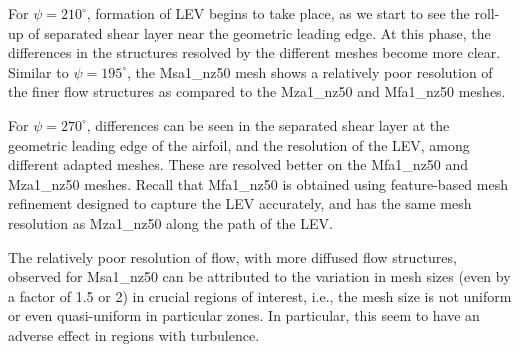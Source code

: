 



For $\psi=210^\circ$, formation of LEV begins to take place, as we start to see the roll-up of separated shear layer near the geometric leading edge. 
At this phase, the differences in the structures resolved by the different meshes become more clear.
Similar to $\psi=195^\circ$, the Msa1\_nz50 mesh shows a relatively poor resolution of the finer flow structures as compared to the Mza1\_nz50 and Mfa1\_nz50 meshes.

For $\psi=270^\circ$, differences can be seen in the separated shear layer at the geometric leading edge of the airfoil, and the resolution of the LEV, among different adapted meshes.
These are resolved better on the Mfa1\_nz50 and Mza1\_nz50 meshes. 
Recall that Mfa1\_nz50 is obtained using feature-based mesh refinement designed to capture the LEV accurately, and has the same mesh resolution as Mza1\_nz50 along the path of the LEV. 

The relatively poor resolution of flow, with more diffused flow structures, observed for Msa1\_nz50 can be attributed to the variation in mesh sizes (even by a factor of 1.5 or 2) in crucial regions of interest, i.e., the mesh size is not uniform or even quasi-uniform in particular zones. In particular, this seem to have an adverse effect in regions with turbulence.

